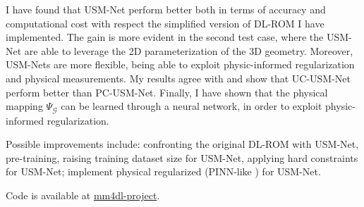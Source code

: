 \documentclass[11pt]{article}
\begin{document}
I have found that USM-Net perform better both in terms of accuracy and computational cost with respect the simplified version of DL-ROM I have implemented. The gain is more evident in the second test case, where the USM-Net are able to leverage the 2D parameterization of the 3D geometry. Moreover, USM-Nets are more flexible, being able to exploit physic-informed regularization and physical measurements. My results agree with \cite{regazzoni2022} and show that UC-USM-Net perform better than PC-USM-Net. Finally, I have shown that the physical mapping $\Psi_{\mathcal G}$ can be learned through a neural network, in order to exploit physic-informed regularization.

Possible improvements include: confronting the original DL-ROM with USM-Net, pre-training, raising training dataset size for USM-Net, applying hard constraints \cite{lu2021physics} for USM-Net; implement physical regularized (PINN-like \cite{raissi2019physics}) for USM-Net. 

Code is available at \href{https://github.com/MatteoCaldana/mm4dl-project}{mm4dl-project}.




\end{document}
